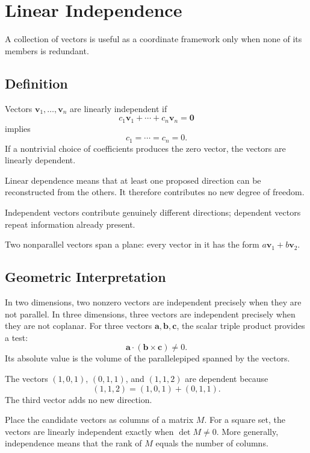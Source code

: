 \section{Linear Independence}
\label{sec:linear-independence}

A collection of vectors is useful as a coordinate framework only when none of its members is redundant.

\subsection{Definition}

Vectors $\mathbf v_1,\ldots,\mathbf v_n$ are linearly independent if
\[
c_1\mathbf v_1+\cdots+c_n\mathbf v_n=\mathbf 0
\]
implies
\[
c_1=\cdots=c_n=0.
\]
If a nontrivial choice of coefficients produces the zero vector, the vectors are linearly dependent.

\begin{physical}
Linear dependence means that at least one proposed direction can be reconstructed from the others. It therefore contributes no new degree of freedom.
\end{physical}

\begin{bookfigure}{Independent vectors contribute genuinely different directions; dependent vectors repeat information already present.}

\end{bookfigure}

\begin{bookfigure}{Two nonparallel vectors span a plane: every vector in it has the form $a\mathbf v_1+b\mathbf v_2$.}

\label{fig:span-plane}
\end{bookfigure}

\subsection{Geometric Interpretation}

In two dimensions, two nonzero vectors are independent precisely when they are not parallel. In three dimensions, three vectors are independent precisely when they are not coplanar. For three vectors $\mathbf a,\mathbf b,\mathbf c$, the scalar triple product provides a test:
\[
\mathbf a\cdot(\mathbf b\times\mathbf c)\neq0.
\]
Its absolute value is the volume of the parallelepiped spanned by the vectors.

\begin{workedexample}
The vectors $(1,0,1)$, $(0,1,1)$, and $(1,1,2)$ are dependent because
\[
(1,1,2)=(1,0,1)+(0,1,1).
\]
The third vector adds no new direction.
\end{workedexample}

\begin{propertybox}
Place the candidate vectors as columns of a matrix $M$. For a square set, the vectors are linearly independent exactly when $\det M\neq0$. More generally, independence means that the rank of $M$ equals the number of columns.
\end{propertybox}
